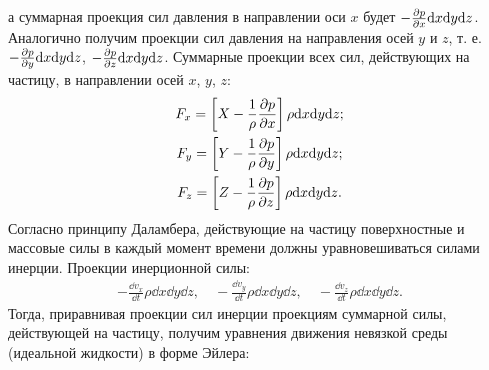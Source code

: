 	а суммарная проекция сил давления в направлении оси $x$ будет $-\frac{\partial p}{\partial x}\mathrm{d} x\mathrm{d} y\mathrm{d} z$. Аналогично получим проекции сил давления на направления осей $y$ и $z$, т. е. $-\frac{\partial p}{\partial y}\mathrm{d} x\mathrm{d} y\mathrm{d} z$, $-\frac{\partial p}{\partial z}\mathrm{d} x\mathrm{d} y\mathrm{d} z$.\n
	Суммарные проекции всех сил, действующих на частицу, в направлении осей $x$, $y$, $z$:
	\begin{gather*}
		F_x = \left[X - \frac{1}{\rho}\frac{\partial p}{\partial x}\right]\rho\mathrm{d} x\mathrm{d} y\mathrm{d} z;\\
		F_y = \left[Y - \frac{1}{\rho}\frac{\partial p}{\partial y}\right]\rho\mathrm{d} x\mathrm{d} y\mathrm{d} z;\\
		F_z = \left[Z - \frac{1}{\rho}\frac{\partial p}{\partial z}\right]\rho\mathrm{d} x\mathrm{d} y\mathrm{d} z.
	\end{gather*}\n
	Согласно принципу Даламбера, действующие на частицу поверхностные и массовые силы в каждый момент времени должны уравновешиваться силами инерции. Проекции инерционной силы:
	\begin{gather*}
		-\frac{\dd v_x}{\dd t}\rho\dd x\dd y\dd z, \quad -\frac{\dd v_y}{\dd t}\rho\dd x\dd y\dd z, \quad -\frac{\dd v_z}{\dd t}\rho\dd x\dd y\dd z.
	\end{gather*}\n
	Тогда, приравнивая проекции сил инерции проекциям суммарной силы, действующей на частицу, получим уравнения движения невязкой среды (идеальной жидкости) в форме Эйлера:
